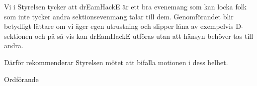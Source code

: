\documentclass[../_main/handlingar.tex]{subfiles}
\begin{document}
\motionssvar

Vi i Styrelsen tycker att drEamHackE är ett bra evenemang som kan locka folk som inte tycker andra sektionsevenmang talar till dem. Genomförandet blir betydligt lättare om vi äger egen utrustning och slipper låna av exempelvis D-sektionen och på så vis kan drEamHackE utföras utan att hänsyn behöver tas till andra.

Därför rekommenderar Styrelsen mötet att bifalla motionen i dess helhet.

\begin{signatures}{1}
    \ist
    \signature{\ordf}{Ordförande}
\end{signatures}
\end{document}
